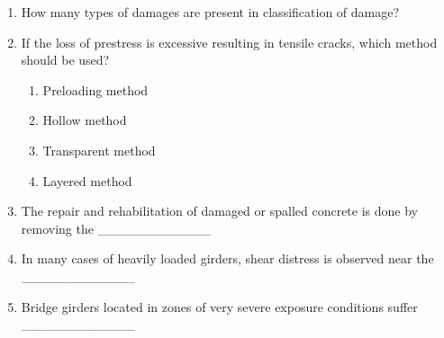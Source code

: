 \documentclass[11pt,a4paper]{article}
\begin{document}
\begin{enumerate}
\item{How many types of damages are present in classification of damage?}
\\
\item{If the loss of prestress is excessive resulting in tensile cracks, which method should be used?}
\begin{enumerate}[label=\Alph*.]
\item{Preloading method}
\item{Hollow method}
\item{Transparent method}
\item{Layered method}
\end{enumerate}
\item{The repair and rehabilitation of damaged or spalled concrete is done by removing the \_\_\_\_\_\_\_\_\_\_\_\_}
\\
\item{In many cases of heavily loaded girders, shear distress is observed near the \_\_\_\_\_\_\_\_\_\_\_\_}
\\
\item{Bridge girders located in zones of very severe exposure conditions suffer \_\_\_\_\_\_\_\_\_\_\_\_}
\\\begin{enumerate*}[itemjoin=\qquad, label=\Alph*.]

\end{enumerate*}
\end{enumerate}
\end{document}
